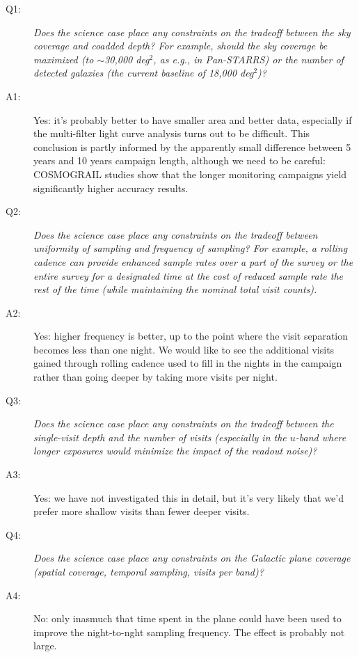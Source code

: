 \begin{description}

\item[Q1:] {\it Does the science case place any constraints on the
tradeoff between the sky coverage and coadded depth? For example, should
the sky coverage be maximized (to $\sim$30,000 deg$^2$, as e.g., in
Pan-STARRS) or the number of detected galaxies (the current baseline
of 18,000 deg$^2$)?}

\item[A1:] Yes: it's probably better to have smaller area and better
data, especially if the multi-filter light curve analysis turns out to
be difficult. This conclusion is partly informed by the apparently small
difference between 5 years and 10 years campaign length, although we
need to be careful: COSMOGRAIL studies show that the longer monitoring
campaigns yield significantly higher accuracy results.

\item[Q2:] {\it Does the science case place any constraints on the
tradeoff between uniformity of sampling and frequency of sampling? For
example, a rolling cadence can provide enhanced sample rates over a part
of the survey or the entire survey for a designated time at the cost of
reduced sample rate the rest of the time (while maintaining the nominal
total visit counts).}

\item[A2:] Yes: higher frequency is better, up to the point where the
visit separation becomes less than one night. We would like to see the
additional visits gained through rolling cadence used to fill in the
nights in the campaign rather than going deeper by taking more visits
per night.

\item[Q3:] {\it Does the science case place any constraints on the
tradeoff between the single-visit depth and the number of visits
(especially in the $u$-band where longer exposures would minimize the
impact of the readout noise)?}

\item[A3:] Yes: we have not investigated this in detail, but it's very
likely that we'd prefer more shallow visits than fewer deeper visits.

\item[Q4:] {\it Does the science case place any constraints on the
Galactic plane coverage (spatial coverage, temporal sampling, visits per
band)?}

\item[A4:] No: only inasmuch that time spent in the plane could have
been used to improve the night-to-nght sampling frequency. The effect is
probably not large.


\end{description}
